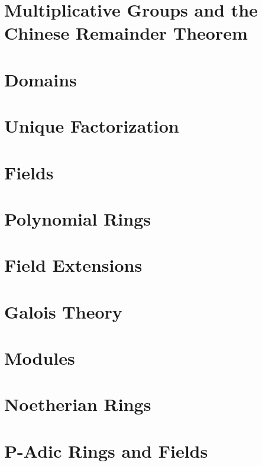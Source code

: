 \documentclass[12pt]{extarticle}
\theoremstyle{definition}
\begin{document}
\section{Multiplicative Groups and the Chinese Remainder Theorem}

\section{Domains}

\section{Unique Factorization}

\section{Fields}

\section{Polynomial Rings}

\section{Field Extensions}

\section{Galois Theory}

\section{Modules}

\section{Noetherian Rings}

\section{P-Adic Rings and Fields}
\end{document}
